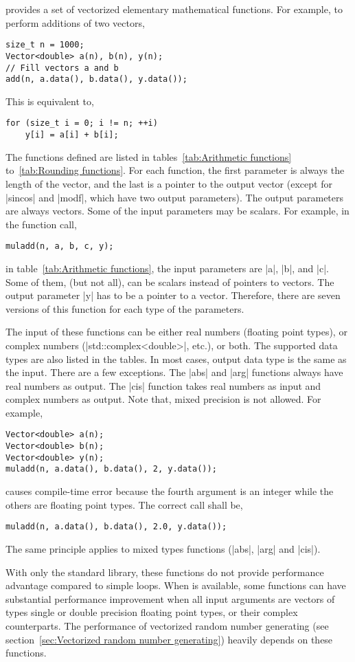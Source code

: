 \mckl provides a set of vectorized elementary mathematical functions. For
example, to perform additions of two vectors,
\begin{verbatim}
size_t n = 1000;
Vector<double> a(n), b(n), y(n);
// Fill vectors a and b
add(n, a.data(), b.data(), y.data());
\end{verbatim}
This is equivalent to,
\begin{verbatim}
for (size_t i = 0; i != n; ++i)
    y[i] = a[i] + b[i];
\end{verbatim}
The functions defined are listed in tables~\ref{tab:Arithmetic functions}
to~\ref{tab:Rounding functions}. For each function, the first parameter is
always the length of the vector, and the last is a pointer to the output vector
(except for |sincos| and |modf|, which have two output parameters). The output
parameters are always vectors. Some of the input parameters may be scalars. For
example, in the function call,
\begin{verbatim}
muladd(n, a, b, c, y);
\end{verbatim}
in table~\ref{tab:Arithmetic functions}, the input parameters are |a|, |b|, and
|c|. Some of them, (but not all), can be scalars instead of pointers to
vectors. The output parameter |y| has to be a pointer to a vector. Therefore,
there are seven versions of this function for each type of the parameters.

The input of these functions can be either real numbers (floating point types),
or complex numbers (|std::complex<double>|, etc.), or both. The supported data
types are also listed in the tables. In most cases, output data type is the
same as the input. There are a few exceptions. The |abs| and |arg| functions
always have real numbers as output. The |cis| function takes real numbers as
input and complex numbers as output. Note that, mixed precision is not allowed.
For example,
\begin{verbatim}
Vector<double> a(n);
Vector<double> b(n);
Vector<double> y(n);
muladd(n, a.data(), b.data(), 2, y.data());
\end{verbatim}
causes compile-time error because the fourth argument is an integer while the
others are floating point types. The correct call shall be,
\begin{verbatim}
muladd(n, a.data(), b.data(), 2.0, y.data());
\end{verbatim}
The same principle applies to mixed types functions (|abs|, |arg| and |cis|).

With only the standard library, these functions do not provide performance
advantage compared to simple loops. When \mkl \vml is available, some functions
can have substantial performance improvement when all input arguments are
vectors of types single or double precision floating point types, or their
complex counterparts. The performance of vectorized random number generating
(see section~\ref{sec:Vectorized random number generating}) heavily depends on
these functions.

